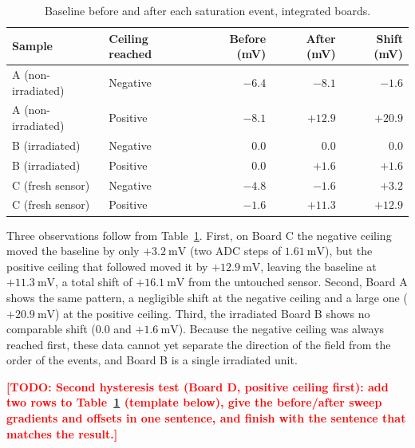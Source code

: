 \documentclass[12pt,a4paper]{article}
\newcommand{\todo}[1]{\textcolor{red}{\textbf{[TODO: #1]}}}
\begin{document}
\begin{table}[H]
\centering
\caption{Baseline before and after each saturation event, integrated boards.}
\label{tab:baseline-shift}
\begin{tabular}{@{}llrrr@{}}
\toprule
Sample & Ceiling reached & Before (mV) & After (mV) & Shift (mV) \\
\midrule
A (non-irradiated) & Negative & $-6.4$ & $-8.1$ & $-1.6$ \\
A (non-irradiated) & Positive & $-8.1$ & $+12.9$ & $+20.9$ \\
B (irradiated) & Negative & $0.0$ & $0.0$ & $0.0$ \\
B (irradiated) & Positive & $0.0$ & $+1.6$ & $+1.6$ \\
C (fresh sensor) & Negative & $-4.8$ & $-1.6$ & $+3.2$ \\
C (fresh sensor) & Positive & $-1.6$ & $+11.3$ & $+12.9$ \\
\bottomrule
\end{tabular}
\end{table}

Three observations follow from Table~\ref{tab:baseline-shift}. First, on Board C the negative ceiling moved the baseline by only $+\SI{3.2}{\milli\volt}$ (two ADC steps of $\SI{1.61}{\milli\volt}$), but the positive ceiling that followed moved it by $+\SI{12.9}{\milli\volt}$, leaving the baseline at $+\SI{11.3}{\milli\volt}$, a total shift of $+\SI{16.1}{\milli\volt}$ from the untouched sensor. Second, Board A shows the same pattern, a negligible shift at the negative ceiling and a large one ($+\SI{20.9}{\milli\volt}$) at the positive ceiling. Third, the irradiated Board B shows no comparable shift ($0.0$ and $+\SI{1.6}{\milli\volt}$). Because the negative ceiling was always reached first, these data cannot yet separate the direction of the field from the order of the events, and Board B is a single irradiated unit.

\todo{Second hysteresis test (Board D, positive ceiling first): add two rows to Table~\ref{tab:baseline-shift} (template below), give the before/after sweep gradients and offsets in one sentence, and finish with the sentence that matches the result.}
\end{document}
